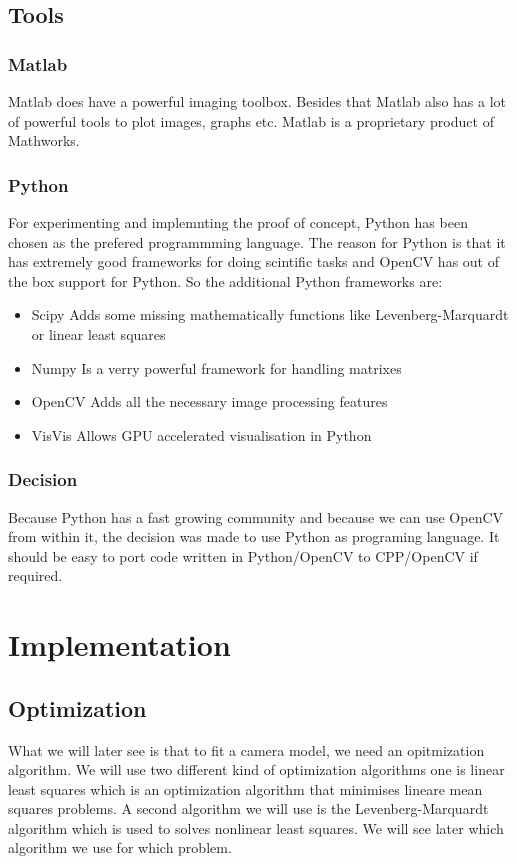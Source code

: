 \documentclass[11pt,a4paper,titlepage,oneside]{report}
\begin{document}
\section{Tools}
\subsection{Matlab}
Matlab does have a powerful imaging toolbox. Besides that Matlab also has a lot of powerful tools to plot images, graphs etc. Matlab is a proprietary product of Mathworks.

\subsection{Python}
For experimenting and implemnting the proof of concept, Python has been chosen as the prefered programmming language. The reason for Python is that it has extremely good frameworks for doing scintific tasks and OpenCV has out of the box support for Python. So the additional Python frameworks are:
\begin{itemize}
  \item Scipy
    \subitem Adds some missing mathematically functions like Levenberg-Marquardt or linear least squares
  \item Numpy
    \subitem Is a verry powerful framework for handling matrixes
  \item OpenCV
    \subitem Adds all the necessary image processing features
  \item VisVis
    \subitem Allows GPU accelerated visualisation in Python
\end{itemize}

\subsection{Decision}
Because Python has a fast growing community and because we can use OpenCV from within it, the decision was made to use Python as programing language. It should be easy to port code written in Python/OpenCV to CPP/OpenCV if required.

\chapter{Implementation}\label{chap:implementation}
\section{Optimization}
What we will later see is that to fit a camera model, we need an opitmization algorithm. We will use two different kind of optimization algorithms one is linear least squares which is an optimization algorithm that minimises lineare mean squares problems. A second algorithm we will use is the Levenberg-Marquardt algorithm which is used to solves nonlinear least squares. We will see later which algorithm we use for which problem.
\end{document}
